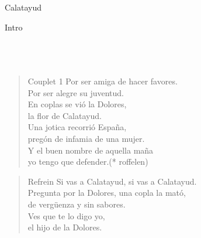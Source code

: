 \begin{song}{Calatayud}
\begin{instrumental}{Intro}
\measure{}\measure{}\measure{}\measure{}\measure*{}\\
\measure{}\measure{}\measure{}\measure{}\measure*{}\\
\measure{}\measure{}\measure{}\measure{}\measure*{}\\
\measure{}\measure{}\measure{}\measure{}\measure*{}\hspace{1.5em}\\
\end{instrumental}

\begin{verse}{Couplet 1}
Por ser amiga de hacer favores.\\
Por ser alegre su juventud.\hspace{0.5em}\hspace{0.5em}\\
En coplas se vió la Dolores,\\
la flor de Calatayud.\\
Una jotica recorrió España,\\
pregón de infamia de una mujer.\\
Y el buen nombre\hspace{0.5em}\hspace{0.5em} de aquella maña\\
yo tengo que defender.\hspace{3em}(* roffelen)\\
\end{verse}

\begin{verse}{Refrein}
Si vas a Calatayud, si vas a Calatayud.\\
Pregunta por la Dolores, una copla la mató,\\
de vergüenza y sin sabores.\\
\chord{}Ves que te lo digo yo,\\
el hijo de la Dolores.\chord{} \hspace{1.5em}\hspace{1.5em}\hspace{1.5em}\\
\end{verse}


\end{song}
